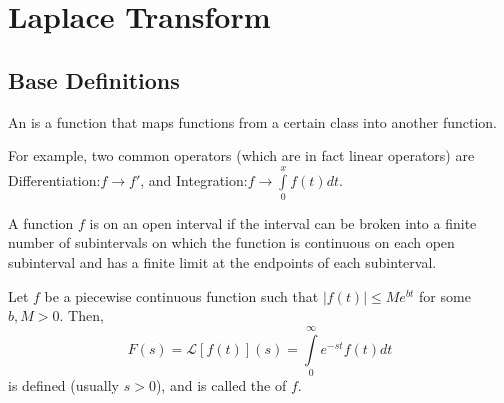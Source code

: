 %
%
%
\chapter{Laplace Transform}
\label{laplace} %

\section{Base Definitions}

\begin{definition}[Operator]
        An  is a function that maps functions from a certain class into another function.
\end{definition}
\begin{example}
        For example, two common operators (which are in fact linear operators) are Differentiation:$f\rightarrow f'$, and Integration:$f\rightarrow \int\limits_{0}^xf(t)dt$.
\end{example}




\begin{definition}
        A function $f$ is  on an open interval if the interval can be broken into a finite number of subintervals on which the function is continuous on each open subinterval and has a finite limit at the endpoints of each subinterval.
\end{definition}



\begin{definition}
        Let $f$ be a piecewise continuous function such that $|f(t)| \leq Me^{bt}$ for some $b,M > 0$. Then, \begin{equation}
                F(s) = \mathcal{L}[f(t)](s) = \int\limits_{0}^{\infty}e^{-st}f(t)dt
        \end{equation} 
        is defined (usually $s > 0$), and is called the  of $f$.
\end{definition}




